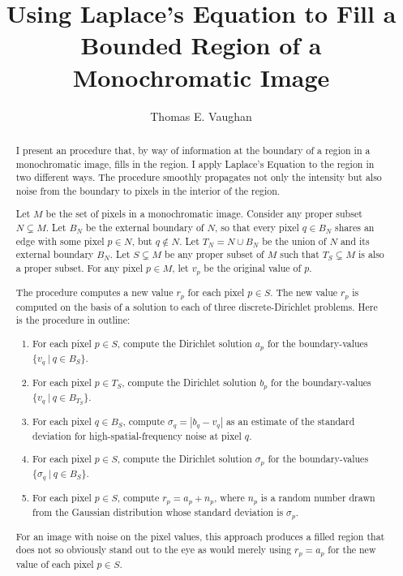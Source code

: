 \documentclass{article}
\title{%
Using Laplace's Equation to Fill a Bounded Region of a Monochromatic Image%
}
\author{Thomas E. Vaughan}
\begin{document}
\maketitle

\begin{abstract}
   I present an procedure that, by way of information at the boundary of a
   region in a monochromatic image, fills in the region.  I apply Laplace's
   Equation to the region in two different ways.  The procedure smoothly
   propagates not only the intensity but also noise from the boundary to pixels
   in the interior of the region.

   Let $M$ be the set of pixels in a monochromatic image.  Consider any proper
   subset $N \subsetneq M$.  Let $B_N$ be the external boundary of $N$, so that
   every pixel $q \in B_N$ shares an edge with some pixel $p \in N$, but $q
   \notin N$.  Let $T_N = N \cup B_N$ be the union of $N$ and its external
   boundary $B_N$.  Let $S \subsetneq M$ be any proper subset of $M$ such that
   $T_S \subsetneq M$ is also a proper subset.  For any pixel $p \in M$, let
   $v_p$ be the original value of $p$.

   The procedure computes a new value $r_p$ for each pixel $p \in S$.  The new
   value $r_p$ is computed on the basis of a solution to each of three
   discrete-Dirichlet problems.  Here is the procedure in outline:
   \begin{enumerate}
      \item For each pixel $p \in S$, compute the Dirichlet solution $a_p$ for
         the boundary-values $\{v_q \: | \: q \in B_S\}$.
      \item For each pixel $p \in T_S$, compute the Dirichlet solution $b_p$
         for the boundary-values $\{v_q \: | \: q \in B_{T_S}\}$.
      \item For each pixel $q \in B_S$, compute $\sigma_q = |b_q - v_q|$ as an
         estimate of the standard deviation for high-spatial-frequency noise at
         pixel $q$.
      \item For each pixel $p \in S$, compute the Dirichlet solution $\sigma_p$
         for the boundary-values $\{\sigma_q \: | \: q \in B_S\}$.
      \item For each pixel $p \in S$, compute $r_p = a_p + n_p$, where $n_p$ is
         a random number drawn from the Gaussian distribution whose standard
         deviation is $\sigma_p$.
   \end{enumerate}
   For an image with noise on the pixel values, this approach produces a filled
   region that does not so obviously stand out to the eye as would merely using
   $r_p = a_p$ for the new value of each pixel $p \in S$.

\end{abstract}
\end{document}
